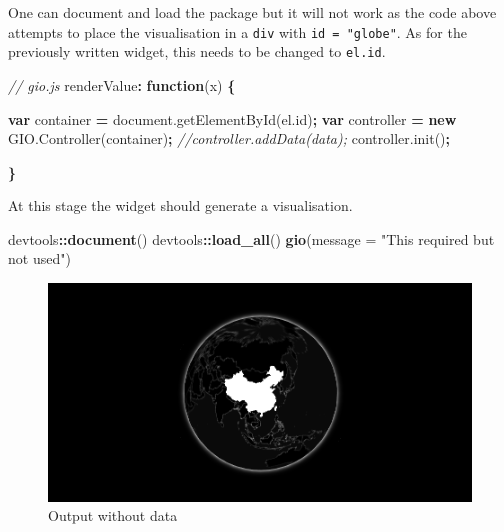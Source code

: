 \documentclass[
]{krantz}
\makeatletter
\newenvironment{Shaded}{\begin{snugshade}}{\end{snugshade}}
\newcommand{\AttributeTok}[1]{\textcolor[rgb]{0.61,0.61,0.61}{#1}}
\newcommand{\CommentTok}[1]{\textcolor[rgb]{0.37,0.37,0.37}{\textit{#1}}}
\newcommand{\DataTypeTok}[1]{\textcolor[rgb]{0.27,0.27,0.27}{#1}}
\newcommand{\KeywordTok}[1]{\textcolor[rgb]{0.27,0.27,0.27}{\textbf{#1}}}
\newcommand{\NormalTok}[1]{#1}
\newcommand{\OperatorTok}[1]{\textcolor[rgb]{0.43,0.43,0.43}{\textbf{#1}}}
\newcommand{\StringTok}[1]{\textcolor[rgb]{0.5,0.5,0.5}{#1}}
\newcommand{\VariableTok}[1]{\textcolor[rgb]{0,0,0}{#1}}
\newenvironment{kframe}{%
\medskip{}
\setlength{\fboxsep}{.8em}
 \def\at@end@of@kframe{}%
 \ifinner\ifhmode%
  \def\at@end@of@kframe{\end{minipage}}%
  \begin{minipage}{\columnwidth}%
 \fi\fi%
 \def\FrameCommand##1{\hskip\@totalleftmargin \hskip-\fboxsep
 \colorbox{shadecolor}{##1}\hskip-\fboxsep
     \hskip-\linewidth \hskip-\@totalleftmargin \hskip\columnwidth}%
 \MakeFramed {\advance\hsize-\width
   \@totalleftmargin\z@ \linewidth\hsize
   \@setminipage}}%
 {\par\unskip\endMakeFramed%
 \at@end@of@kframe}
\renewenvironment{Shaded}{\begin{kframe}}{\end{kframe}}
\makeatother
\begin{document}
One can document and load the package but it will not work as the code above attempts to place the visualisation in a \texttt{div} with \texttt{id\ =\ "globe"}. As for the previously written widget, this needs to be changed to \texttt{el.id}.

\begin{Shaded}
\begin{Highlighting}[]
\CommentTok{// gio.js}
\NormalTok{renderValue}\OperatorTok{:} \KeywordTok{function}\NormalTok{(x) }\OperatorTok{\{}

  \KeywordTok{var}\NormalTok{ container }\OperatorTok{=} \VariableTok{document}\NormalTok{.}\AttributeTok{getElementById}\NormalTok{(}\VariableTok{el}\NormalTok{.}\AttributeTok{id}\NormalTok{)}\OperatorTok{;}
  \KeywordTok{var}\NormalTok{ controller }\OperatorTok{=} \KeywordTok{new} \VariableTok{GIO}\NormalTok{.}\AttributeTok{Controller}\NormalTok{(container)}\OperatorTok{;}
  \CommentTok{//controller.addData(data);}
  \VariableTok{controller}\NormalTok{.}\AttributeTok{init}\NormalTok{()}\OperatorTok{;}

\OperatorTok{\}}
\end{Highlighting}
\end{Shaded}

At this stage the widget should generate a visualisation.

\begin{Shaded}
\begin{Highlighting}[]
\NormalTok{devtools}\OperatorTok{::}\KeywordTok{document}\NormalTok{()}
\NormalTok{devtools}\OperatorTok{::}\KeywordTok{load\_all}\NormalTok{()}
\KeywordTok{gio}\NormalTok{(}\DataTypeTok{message =} \StringTok{"This required but not used"}\NormalTok{)}
\end{Highlighting}
\end{Shaded}

\begin{figure}
\centering
\includegraphics{images/gio-init.png}
\caption{Output without data}
\end{figure}
\end{document}
